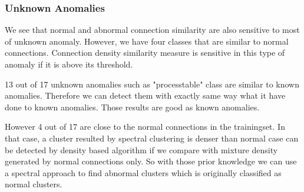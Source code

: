 \subsubsection{Unknown Anomalies}
We see that normal and abnormal connection similarity are also sensitive to most of unknown anomaly. 
However, we have four classes that are similar to normal connections. 
Connection density similarity measure is sensitive in this type of anomaly if it is above its threshold. 

13 out of 17 unknown anomalies such as "processtable" class are similar to known anomalies. 
Therefore we can detect them with exactly same way what it have done to known anomalies. 
Those results are good as known anomalies. 

\begin{table}[h]
\begin{center}
\end{center}
\caption{Unknown anomalies that is similar to the known anomalies detection rate}
\label{fig:refSingleRobot1}
\end{table}

However 4 out of 17 are close to the normal connections in the trainingset. 
In that case, a cluster resulted by spectral clustering is denser than normal case can be detected by density based algorithm if we compare with mixture density generated by normal connections only. 
So with those prior knowledge we can use a spectral approach to find abnormal clusters which is originally classified as normal clusters. 

